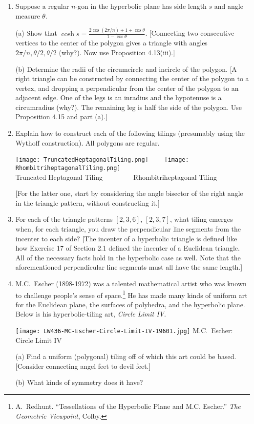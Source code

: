 \documentclass[leqno]{book}
\begin{document}
\begin{enumerate}
\item Suppose a regular $n$-gon in the hyperbolic plane has side length $s$ and angle measure $\theta$.

(a) Show that $\cosh s=\frac{2\cos(2\pi/n)+1+\cos\theta}{1-\cos\theta}$.  [Connecting two consecutive vertices to the center of the polygon gives a triangle with angles $2\pi/n,\theta/2,\theta/2$ (why?).  Now use Proposition 4.13(iii).]

(b) Determine the radii of the circumcircle and incircle of the polygon.  [A right triangle can be constructed by connecting the center of the polygon to a vertex, and dropping a perpendicular from the center of the polygon to an adjacent edge.  One of the legs is an inradius and the hypotenuse is a circumradius (why?).  The remaining leg is half the side of the polygon.  Use Proposition 4.15 and part (a).]

\item Explain how to construct each of the following tilings (presumably using the Wythoff construction).  All polygons are regular.
\begin{center}
\texttt{[image: TruncatedHeptagonalTiling.png]}~~~~
\texttt{[image: RhombitriheptagonalTiling.png]}\\
Truncated Heptagonal Tiling~~~~~~~~~Rhombitriheptagonal Tiling
\end{center}
[For the latter one, start by considering the angle bisector of the right angle in the triangle pattern, without constructing it.]

\item For each of the triangle patterns $[2,3,6]$, $[2,3,7]$, what tiling emerges when, for each triangle, you draw the perpendicular line segments from the incenter to each side?  [The incenter of a hyperbolic triangle is defined like how Exercise 17 of Section 2.1 defined the incenter of a Euclidean triangle.  All of the necessary facts hold in the hyperbolic case as well.  Note that the aforementioned perpendicular line segments must all have the same length.]

\item M.C.~Escher (1898-1972) was a talented mathematical artist who was known to challenge people's sense of space.\footnote{A.~Redhunt. ``Tessellations of the Hyperbolic Plane and M.C. Escher.''  \emph{The Geometric Viewpoint}, Colby.}  He has made many kinds of uniform art for the Euclidean plane, the surfaces of polyhedra, and the hyperbolic plane.  Below is his hyperbolic-tiling art, \emph{Circle Limit IV}.
\begin{center}
\texttt{[image: LW436-MC-Escher-Circle-Limit-IV-19601.jpg]}
M.C.~Escher: Circle Limit IV
\end{center}
(a) Find a uniform (polygonal) tiling off of which this art could be based.  [Consider connecting angel feet to devil feet.]

(b) What kinds of symmetry does it have?
\end{enumerate}
\end{document}
